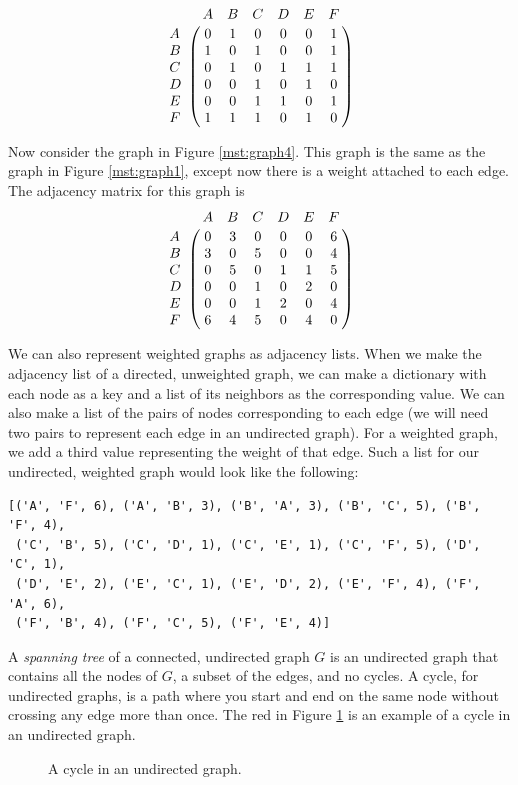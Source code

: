 \[
\bordermatrix{\hspace{.4cm}&A&B&C&D&E&F\cr
A&0 & 1 & 0 & 0 & 0 & 1\cr
B&1 & 0 & 1 & 0 & 0 & 1\cr
C&0 & 1 & 0 & 1 & 1 & 1\cr
D&0 & 0 & 1 & 0 & 1 & 0\cr
E&0 & 0 & 1 & 1 & 0 & 1\cr
F&1 & 1 & 1 & 0 & 1 & 0\cr}
\]

Now consider the graph in Figure \ref{mst:graph4}.  This graph is the same as the graph in Figure \ref{mst:graph1}, except now there is a weight attached to each edge.  The adjacency matrix for this graph is
\[
\bordermatrix{\hspace{.4cm}&A&B&C&D&E&F\cr
A&0 & 3 & 0 & 0 & 0 & 6\cr
B&3 & 0 & 5 & 0 & 0 & 4\cr
C&0 & 5 & 0 & 1 & 1 & 5\cr
D&0 & 0 & 1 & 0 & 2 & 0\cr
E&0 & 0 & 1 & 2 & 0 & 4\cr
F&6 & 4 & 5 & 0 & 4 & 0\cr}
\]

We can also represent weighted graphs as adjacency lists. When we make the adjacency list of a directed, unweighted graph, we can make a dictionary with each node as a key and a list of its neighbors as the corresponding value. We can also make a list of the pairs of nodes corresponding to each edge (we will need two pairs to represent each edge in an undirected graph). For a weighted graph, we add a third value representing the weight of that edge.
Such a list for our undirected, weighted graph would look like the following:

\begin{lstlisting}
[('A', 'F', 6), ('A', 'B', 3), ('B', 'A', 3), ('B', 'C', 5), ('B', 'F', 4),
 ('C', 'B', 5), ('C', 'D', 1), ('C', 'E', 1), ('C', 'F', 5), ('D', 'C', 1), 
 ('D', 'E', 2), ('E', 'C', 1), ('E', 'D', 2), ('E', 'F', 4), ('F', 'A', 6), 
 ('F', 'B', 4), ('F', 'C', 5), ('F', 'E', 4)]
\end{lstlisting}

A \emph{spanning tree} of a connected, undirected graph $G$ is an undirected graph that contains all the nodes of $G$, a subset of the edges, and no cycles.
A cycle, for undirected graphs, is a path where you start and end on the same node without crossing any edge more than once.
The red in Figure \ref{mst:graph2} is an example of a cycle in an undirected graph.

\begin{figure}[H]
\caption{A cycle in an undirected graph.}
\label{mst:graph2}
\end{figure}

